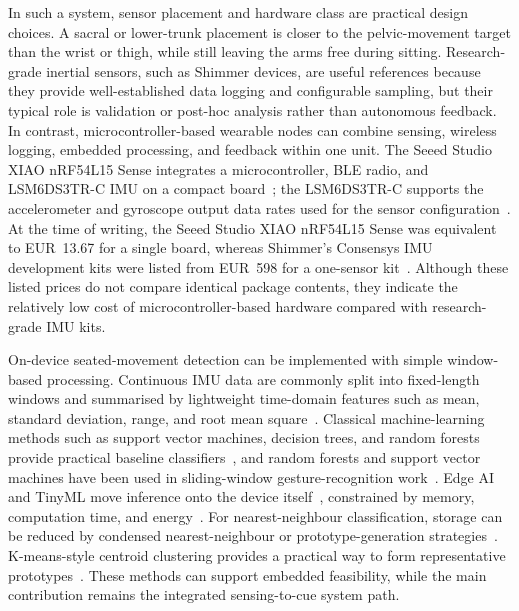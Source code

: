 In such a system, sensor placement and hardware class are practical design choices. A sacral or lower-trunk placement is closer to the pelvic-movement target than the wrist or thigh, while still leaving the arms free during sitting. Research-grade inertial sensors, such as Shimmer devices, are useful references because they provide well-established data logging and configurable sampling, but their typical role is validation or post-hoc analysis rather than autonomous feedback. In contrast, microcontroller-based wearable nodes can combine sensing, wireless logging, embedded processing, and feedback within one unit. The Seeed Studio XIAO nRF54L15 Sense integrates a microcontroller, BLE radio, and LSM6DS3TR-C IMU on a compact board~\citep{seeed_xiao_nrf54l15_sense}; the LSM6DS3TR-C supports the accelerometer and gyroscope output data rates used for the sensor configuration~\citep{stmicroelectronics_lsm6ds3trc}. At the time of writing, the Seeed Studio XIAO nRF54L15 Sense was equivalent to EUR~13.67 for a single board, whereas Shimmer's Consensys IMU development kits were listed from EUR~598 for a one-sensor kit~\citep{seeed_xiao_nrf54l15_sense_store,shimmer_consensys_imu_devkit}. Although these listed prices do not compare identical package contents, they indicate the relatively low cost of microcontroller-based hardware compared with research-grade IMU kits.

On-device seated-movement detection can be implemented with simple window-based processing. Continuous IMU data are commonly split into fixed-length windows and summarised by lightweight time-domain features such as mean, standard deviation, range, and root mean square~\citep{khan2013exploratory}. Classical machine-learning methods such as support vector machines, decision trees, and random forests provide practical baseline classifiers~\citep{bonaccorso2017machine}, and random forests and support vector machines have been used in sliding-window gesture-recognition work~\citep{deboeverie2016human}. Edge AI and TinyML move inference onto the device itself~\citep{diab2022embedded,abadade2023tinyml,lin2023embedded}, constrained by memory, computation time, and energy~\citep{branco2019machine,immonen2022tinyml,heydari2025tinyml}. For nearest-neighbour classification, storage can be reduced by condensed nearest-neighbour or prototype-generation strategies~\citep{hart1968condensed,triguero2012prototype_generation}. K-means-style centroid clustering provides a practical way to form representative prototypes~\citep{zubair2024kmeans}. These methods can support embedded feasibility, while the main contribution remains the integrated sensing-to-cue system path.


